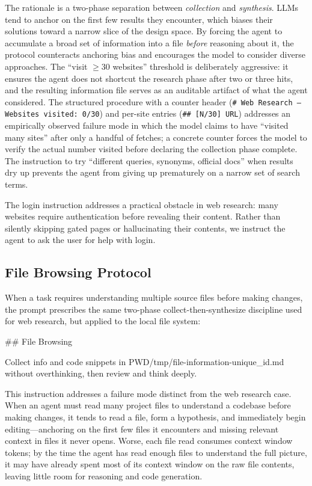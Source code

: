 \documentclass{article}
\begin{document}
\noindent The rationale is a two-phase separation between \emph{collection} and \emph{synthesis}.  LLMs tend to anchor on the first few results they encounter, which biases their solutions toward a narrow slice of the design space.  By forcing the agent to accumulate a broad set of information into a file \emph{before} reasoning about it, the protocol counteracts anchoring bias and encourages the model to consider diverse approaches.  The ``visit $\geq$30 websites'' threshold is deliberately aggressive: it ensures the agent does not shortcut the research phase after two or three hits, and the resulting information file serves as an auditable artifact of what the agent considered.  The structured procedure with a counter header (\texttt{\# Web Research --- Websites visited: 0/30}) and per-site entries (\texttt{\#\# [N/30] URL}) addresses an empirically observed failure mode in which the model claims to have ``visited many sites'' after only a handful of fetches; a concrete counter forces the model to verify the actual number visited before declaring the collection phase complete.  The instruction to try ``different queries, synonyms, official docs'' when results dry up prevents the agent from giving up prematurely on a narrow set of search terms.

The login instruction addresses a practical obstacle in web research: many websites require authentication before revealing their content.  Rather than silently skipping gated pages or hallucinating their contents, we instruct the agent to ask the user for help with login.

\subsection{File Browsing Protocol}

When a task requires understanding multiple source files before making changes, the prompt prescribes the same two-phase collect-then-synthesize discipline used for web research, but applied to the local file system:

\begin{prompt}
## File Browsing

Collect info and code snippets in PWD/tmp/file-information-{unique_id}.md without overthinking, then review and think deeply.
\end{prompt}

\noindent This instruction addresses a failure mode distinct from the web research case.  When an agent must read many project files to understand a codebase before making changes, it tends to read a file, form a hypothesis, and immediately begin editing---anchoring on the first few files it encounters and missing relevant context in files it never opens.  Worse, each file read consumes context window tokens; by the time the agent has read enough files to understand the full picture, it may have already spent most of its context window on the raw file contents, leaving little room for reasoning and code generation.
\end{document}
